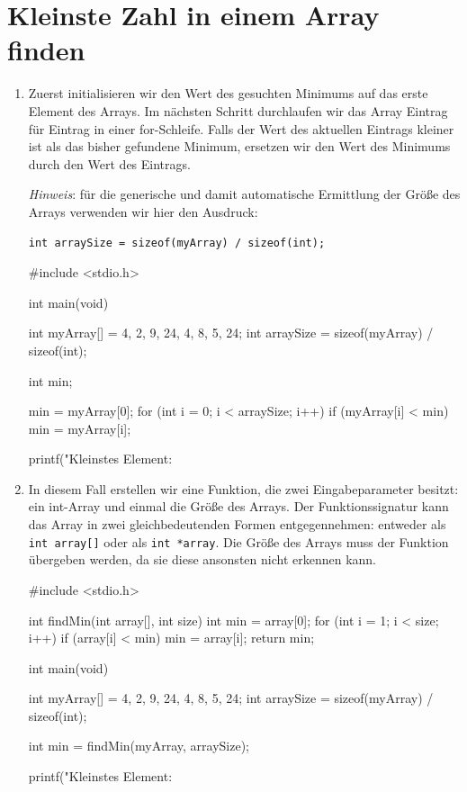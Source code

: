 \chapter{Kleinste Zahl in einem Array finden}

\begin{enumerate}
  \item Zuerst initialisieren wir den Wert des gesuchten Minimums auf das erste
  Element des Arrays. Im nächsten Schritt durchlaufen wir das Array Eintrag für
  Eintrag in einer for-Schleife. Falls der Wert des aktuellen Eintrags kleiner
  ist als das bisher gefundene Minimum, ersetzen wir den Wert des Minimums
  durch den Wert des Eintrags.

  \textit{Hinweis}: für die generische und damit automatische Ermittlung der
  Größe des Arrays verwenden wir hier den Ausdruck:

\noindent\texttt{int arraySize = sizeof(myArray) / sizeof(int);}

\begin{codebox}[lang=c, fontsize=\small]
#include <stdio.h>

int main(void) {
    int myArray[] = {4, 2, 9, 24, 4, 8, 5, 24};
    int arraySize = sizeof(myArray) / sizeof(int);

    int min;

    min = myArray[0];
    for (int i = 0; i < arraySize; i++) {
        if (myArray[i] < min) {
            min = myArray[i];
        }
    }

    printf("Kleinstes Element: %
}
\end{codebox}

  \item In diesem Fall erstellen wir eine Funktion, die zwei Eingabeparameter
  besitzt: ein int-Array und einmal die Größe des Arrays. Der Funktionssignatur
  kann das Array in zwei gleichbedeutenden Formen entgegennehmen: entweder als
  \texttt{int array[]} oder als \texttt{int *array}. Die Größe
  des Arrays muss der Funktion übergeben werden, da sie diese ansonsten nicht
  erkennen kann.

\begin{codebox}[lang=c, fontsize=\small]
#include <stdio.h>

int findMin(int array[], int size) {
    int min = array[0];
    for (int i = 1; i < size; i++) {
        if (array[i] < min) {
            min = array[i];
        }
    }
    return min;
}

int main(void) {
    int myArray[] = {4, 2, 9, 24, 4, 8, 5, 24};
    int arraySize = sizeof(myArray) / sizeof(int);

    int min = findMin(myArray, arraySize);

    printf("Kleinstes Element: %
}
\end{codebox}

\end{enumerate}



